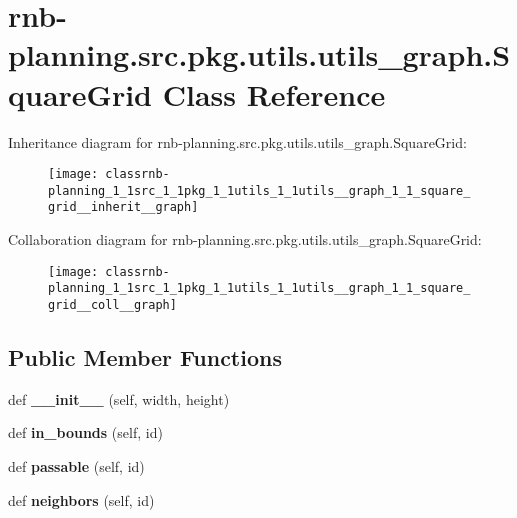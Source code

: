 \hypertarget{classrnb-planning_1_1src_1_1pkg_1_1utils_1_1utils__graph_1_1_square_grid}{}\section{rnb-\/planning.src.\+pkg.\+utils.\+utils\+\_\+graph.\+Square\+Grid Class Reference}
\label{classrnb-planning_1_1src_1_1pkg_1_1utils_1_1utils__graph_1_1_square_grid}


Inheritance diagram for rnb-\/planning.src.\+pkg.\+utils.\+utils\+\_\+graph.\+Square\+Grid\+:\nopagebreak
\begin{figure}[H]
\begin{center}
\leavevmode
\texttt{[image: classrnb-planning\_1\_1src\_1\_1pkg\_1\_1utils\_1\_1utils\_\_graph\_1\_1\_square\_grid\_\_inherit\_\_graph]}
\end{center}
\end{figure}


Collaboration diagram for rnb-\/planning.src.\+pkg.\+utils.\+utils\+\_\+graph.\+Square\+Grid\+:\nopagebreak
\begin{figure}[H]
\begin{center}
\leavevmode
\texttt{[image: classrnb-planning\_1\_1src\_1\_1pkg\_1\_1utils\_1\_1utils\_\_graph\_1\_1\_square\_grid\_\_coll\_\_graph]}
\end{center}
\end{figure}
\subsection*{Public Member Functions}
\begin{DoxyCompactItemize}
\item 
\mbox{\label{classrnb-planning_1_1src_1_1pkg_1_1utils_1_1utils__graph_1_1_square_grid_ac127f469ece4f5546c204deee7070bce}} 
def {\bfseries \+\_\+\+\_\+init\+\_\+\+\_\+} (self, width, height)
\item 
\mbox{\label{classrnb-planning_1_1src_1_1pkg_1_1utils_1_1utils__graph_1_1_square_grid_a868a04ae8a48050a99140e45a729fa56}} 
def {\bfseries in\+\_\+bounds} (self, id)
\item 
\mbox{\label{classrnb-planning_1_1src_1_1pkg_1_1utils_1_1utils__graph_1_1_square_grid_a02c45dd5ad0128d2ac5482846781cc36}} 
def {\bfseries passable} (self, id)
\item 
\mbox{\label{classrnb-planning_1_1src_1_1pkg_1_1utils_1_1utils__graph_1_1_square_grid_a21e9e5adfebd0ea74b7b353d54514531}} 
def {\bfseries neighbors} (self, id)
\end{DoxyCompactItemize}
